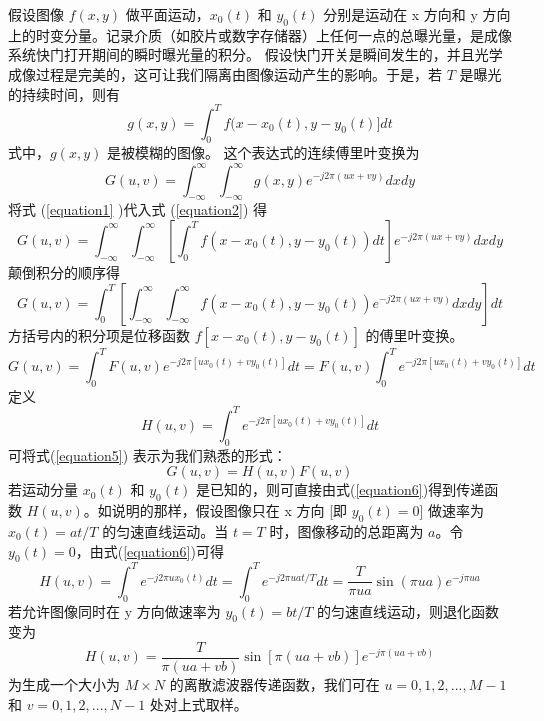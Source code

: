 \documentclass[UTF8]{article}
\begin{document}
    假设图像 $f(x,y)$ 做平面运动，$x_0(t)$ 和 $y_0(t)$ 分别是运动在 x 方向和 y 方向上的时变分量。记录介质（如胶片或数字存储器）上任何一点的总曝光量，是成像系统快门打开期间的瞬时曝光量的积分。
假设快门开关是瞬间发生的，并且光学成像过程是完美的，这可让我们隔离由图像运动产生的影响。于是，若 $T$ 是曝光的持续时间，则有
\begin{equation}
 g(x,y) = \int_0^T f(x - x_0(t), y - y_0(t)] dt 
 \label{equation1}
\end{equation}
式中，$g(x,y)$ 是被模糊的图像。
这个表达式的连续傅里叶变换为
\begin{equation}
 G(u,v) = \int_{-\infty}^{\infty} \int_{-\infty}^{\infty} g(x,y) e^{-j2\pi(ux+vy)} dx dy 
 \label{equation2}
\end{equation}
将式 (\ref{equation1} )代入式 (\ref{equation2}) 得
\begin{equation}
 G(u,v) = \int_{-\infty}^{\infty} \int_{-\infty}^{\infty} \left[ \int_0^T f(x-x_0(t), y-y_0(t)) dt \right] e^{-j2\pi(ux+vy)} dx dy 
 \label{equation3}
\end{equation}
颠倒积分的顺序得
\begin{equation}
     G(u,v) = \int_0^T \left[ \int_{-\infty}^{\infty} \int_{-\infty}^{\infty} f(x-x_0(t), y-y_0(t)) e^{-j2\pi(ux+vy)} dx dy \right] dt 
\label{equation4}
\end{equation}
方括号内的积分项是位移函数 $f[x-x_0(t), y-y_0(t)]$ 的傅里叶变换。
\begin{equation}
 G(u,v) = \int_0^T F(u,v) e^{-j2\pi[ux_0(t)+vy_0(t)]} dt = F(u,v) \int_0^T e^{-j2\pi[ux_0(t)+vy_0(t)]} dt  
\label{equation5}
\end{equation}
定义
\begin{equation}
 H(u,v) = \int_0^T e^{-j2\pi[ux_0(t)+vy_0(t)]} dt  
\label{equation6}
\end{equation}
可将式(\ref{equation5}) 表示为我们熟悉的形式：
\begin{equation}
 G(u,v) = H(u,v) F(u,v)
\label{equation7}
\end{equation}
若运动分量 $x_0(t)$ 和 $y_0(t)$ 是已知的，则可直接由式(\ref{equation6})得到传递函数 $H(u,v)$。如说明的那样，假设图像只在 x 方向 [即 $y_0(t)=0$] 做速率为 $x_0(t)=at/T$ 的匀速直线运动。当 $t=T$ 时，图像移动的总距离为 $a$。令 $y_0(t)=0$，由式(\ref{equation6})可得
\begin{equation}
    H(u,v) = \int_0^T e^{-j2\pi u x_0(t)} dt = \int_0^T e^{-j2\pi u at/T} dt = \frac{T}{\pi u a} \sin(\pi u a) e^{-j\pi u a} 
    \label{equation8}
\end{equation}
若允许图像同时在 y 方向做速率为 $y_0(t)=bt/T$ 的匀速直线运动，则退化函数变为
\begin{equation}
    \boxed{
    H(u,v) = \frac{T}{\pi(ua+vb)} \sin[\pi(ua+vb)] e^{-j\pi(ua+vb)} 
    }
\label{euation9}
\end{equation}
为生成一个大小为 $M \times N$ 的离散滤波器传递函数，我们可在 $u=0,1,2,...,M-1$ 和 $v=0,1,2,...,N-1$ 处对上式取样。
\end{document}
